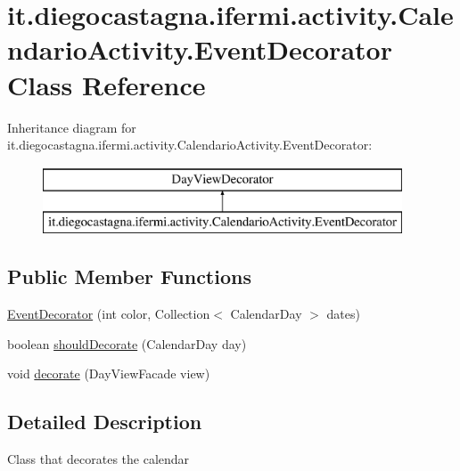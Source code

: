 \hypertarget{classit_1_1diegocastagna_1_1ifermi_1_1activity_1_1_calendario_activity_1_1_event_decorator}{}\section{it.\+diegocastagna.\+ifermi.\+activity.\+Calendario\+Activity.\+Event\+Decorator Class Reference}
\label{classit_1_1diegocastagna_1_1ifermi_1_1activity_1_1_calendario_activity_1_1_event_decorator}
Inheritance diagram for it.\+diegocastagna.\+ifermi.\+activity.\+Calendario\+Activity.\+Event\+Decorator\+:\begin{figure}[H]
\begin{center}
\leavevmode
\includegraphics[height=2.000000cm]{classit_1_1diegocastagna_1_1ifermi_1_1activity_1_1_calendario_activity_1_1_event_decorator}
\end{center}
\end{figure}
\subsection*{Public Member Functions}
\begin{DoxyCompactItemize}
\item 
\mbox{\hyperlink{classit_1_1diegocastagna_1_1ifermi_1_1activity_1_1_calendario_activity_1_1_event_decorator_ab7cc231fc48a36d29c7dc99061f1a2ad}{Event\+Decorator}} (int color, Collection$<$ Calendar\+Day $>$ dates)
\item 
boolean \mbox{\hyperlink{classit_1_1diegocastagna_1_1ifermi_1_1activity_1_1_calendario_activity_1_1_event_decorator_a25fb467eecedbc798df6c9c62d73603c}{should\+Decorate}} (Calendar\+Day day)
\item 
void \mbox{\hyperlink{classit_1_1diegocastagna_1_1ifermi_1_1activity_1_1_calendario_activity_1_1_event_decorator_aa72320995c6e88e3a380d8e2f1e75fd1}{decorate}} (Day\+View\+Facade view)
\end{DoxyCompactItemize}


\subsection{Detailed Description}
Class that decorates the calendar 

